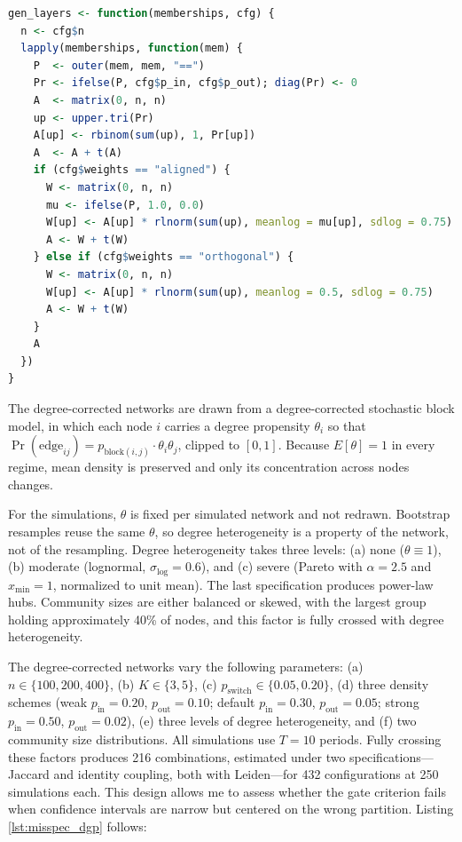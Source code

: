 \documentclass[11pt, letterpaper]{article}
\numberwithin{equation}{section}
\begin{document}
\begin{singlespace}
\begin{lstlisting}[language=R,
  caption={Edges are Bernoulli draws from the
  planted partition; weights are lognormal and either aligned with block
  structure or orthogonal to it.},
  label={lst:valued_dgp}]
gen_layers <- function(memberships, cfg) {
  n <- cfg$n
  lapply(memberships, function(mem) {
    P  <- outer(mem, mem, "==")
    Pr <- ifelse(P, cfg$p_in, cfg$p_out); diag(Pr) <- 0
    A  <- matrix(0, n, n)
    up <- upper.tri(Pr)
    A[up] <- rbinom(sum(up), 1, Pr[up])
    A  <- A + t(A)
    if (cfg$weights == "aligned") {
      W <- matrix(0, n, n)
      mu <- ifelse(P, 1.0, 0.0)
      W[up] <- A[up] * rlnorm(sum(up), meanlog = mu[up], sdlog = 0.75)
      A <- W + t(W)
    } else if (cfg$weights == "orthogonal") {
      W <- matrix(0, n, n)
      W[up] <- A[up] * rlnorm(sum(up), meanlog = 0.5, sdlog = 0.75)
      A <- W + t(W)
    }
    A
  })
}
\end{lstlisting}
\end{singlespace}

The degree-corrected networks are drawn from a degree-corrected stochastic block model, in which each node $i$ carries a degree propensity $\theta_i$ so that $\Pr(\mathrm{edge}_{ij}) = p_{\mathrm{block}(i,j)} \cdot \theta_i \theta_j$, clipped to $[0,1]$. Because $E[\theta] = 1$ in every regime, mean density is preserved and only its concentration across nodes changes.

For the simulations, $\theta$ is fixed per simulated network and not redrawn. Bootstrap resamples reuse the same $\theta$, so degree heterogeneity is a property of the network, not of the resampling. Degree heterogeneity takes three levels: (a) none ($\theta \equiv 1$), (b) moderate (lognormal, $\sigma_{\log} = 0.6$), and (c) severe (Pareto with $\alpha = 2.5$ and $x_{\min} = 1$, normalized to unit mean). The last specification produces power-law hubs. Community sizes are either balanced or skewed, with the largest group holding approximately 40\% of nodes, and this factor is fully crossed with degree heterogeneity.

The degree-corrected networks vary the following parameters: (a) $n \in \{100, 200, 400\}$, (b) $K \in \{3, 5\}$, (c) $p_{\mathrm{switch}} \in \{0.05, 0.20\}$, (d) three density schemes (weak $p_{\mathrm{in}} = 0.20$, $p_{\mathrm{out}} = 0.10$; default $p_{\mathrm{in}} = 0.30$, $p_{\mathrm{out}} = 0.05$; strong $p_{\mathrm{in}} = 0.50$, $p_{\mathrm{out}} = 0.02$), (e) three levels of degree heterogeneity, and (f) two community size distributions. All simulations use $T = 10$ periods. Fully crossing these factors produces 216 combinations, estimated under two specifications---Jaccard and identity coupling, both with Leiden---for 432 configurations at 250 simulations each. This design allows me to assess whether the gate criterion fails when confidence intervals are narrow but centered on the wrong partition. Listing \ref{lst:misspec_dgp} follows:
\end{document}
